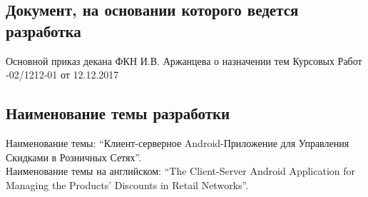 \subsection{Документ, на основании которого ведется разработка}
Основной приказ декана ФКН И.В. Аржанцева о назначении тем Курсовых Работ
-02/1212-01 от 12.12.2017

\subsection{Наименование темы разработки}
Наименование темы: ``Клиент-серверное Android-Приложение для Управления Скидками в Розничных Сетях''. \\
Наименование темы на английском: ``The Client-Server Android Application for Managing the Products' Discounts in Retail Networks''.
